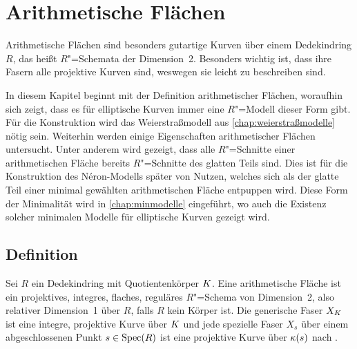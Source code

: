 \chapter{Arithmetische Flächen}\label{chap:arithmetischeflächen}
Arithmetische Flächen sind besonders gutartige Kurven über
einem Dedekindring $R$, das heißt $R$"=Schemata der Dimension~2.
Besonders wichtig ist, dass ihre Fasern alle projektive Kurven sind,
weswegen sie leicht zu beschreiben sind.

In diesem Kapitel beginnt mit der Definition arithmetischer Flächen,
woraufhin sich zeigt, dass es für elliptische Kurven immer eine
$R$"=Modell dieser Form gibt. Für die Konstruktion wird das Weierstraßmodell
aus \autoref{chap:weierstraßmodelle} nötig sein.
Weiterhin werden einige Eigenschaften arithmetischer Flächen
untersucht. Unter anderem wird gezeigt, dass alle $R$"=Schnitte einer
arithmetischen Fläche bereits $R$"=Schnitte des glatten Teils
sind. Dies ist für die Konstruktion des Néron-Modells später von
Nutzen, welches sich als der glatte Teil einer minimal gewählten
arithmetischen Fläche entpuppen wird.
Diese Form der Minimalität wird in \autoref{chap:minmodelle}
eingeführt, wo auch die Existenz solcher minimalen Modelle für
elliptische Kurven gezeigt wird.

\section{Definition}
\begin{Definition}
  Sei $R$ ein Dedekindring mit Quotientenkörper $K$.
  Eine arithmetische Fläche ist ein projektives, integres, flaches,
  reguläres $R$"=Schema von Dimension~2, also relativer Dimension~1 über
  $R$, falls $R$ kein Körper ist.
  Die generische Faser $X_{K}$ ist eine integre, projektive Kurve über
  $K$ und jede spezielle Faser $X_s$ über einem abgeschlossenen Punkt
  $s\in\operatorname{Spec}(R)$ ist eine projektive Kurve über $\kappa(s)$ nach
  \cite[Lemma~8.3.3]{liu}.
\end{Definition}

